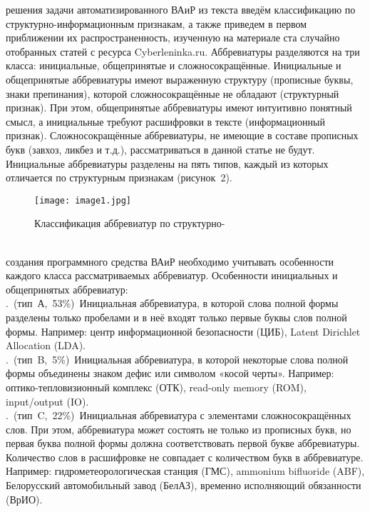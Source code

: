 \documentclass[a4paper, 12pt]{article}
\begin{document}
 решения задачи автоматизированного ВАиР из текста введём классификацию по структурно-информационным признакам, а также приведем в первом приближении их распространенность, изученную на материале ста случайно отобранных статей с ресурса Cyberleninka.ru. Аббревиатуры разделяются на три класса: инициальные, общепринятые и сложносокращённые. Инициальные и общепринятые аббревиатуры имеют выраженную структуру (прописные буквы, знаки препинания), которой сложносокращённые не обладают (структурный признак). При этом, общепринятые аббревиатуры имеют интуитивно понятный смысл, а инициальные требуют расшифровки в тексте (информационный признак). Сложносокращённые аббревиатуры, не имеющие в составе прописных букв (завхоз, ликбез и т.д.), рассматриваться в данной статье не будут. Инициальные аббревиатуры разделены на пять типов, каждый из которых отличается по структурным признакам (рисунок 2).
\begin{figure}[!h]
    \begin{center}
        \texttt{[image: image1.jpg]}
        \caption{Классификация аббревиатур по структурно-\\ }
        \label{claster_pic1}
    \end{center}
\end{figure}
\\
 создания программного средства ВАиР необходимо учитывать особенности каждого класса рассматриваемых аббревиатур. 
Особенности инициальных и общепринятых аббревиатур:\\
. (тип А, 53\%) Инициальная аббревиатура, в которой слова полной формы разделены только пробелами и в неё входят только первые буквы слов полной формы. Например: центр информационной безопасности (ЦИБ), Latent Dirichlet Allocation (LDA).\\
. (тип B, 5\%) Инициальная аббревиатура, в которой некоторые слова полной формы объединены знаком дефис или символом «косой черты». Например: оптико-тепловизионный комплекс (ОТК), read-only memory (ROM), input/output (IO).\\
. (тип C, 22\%) Инициальная аббревиатура с элементами сложносокращённых слов. При этом, аббревиатура может состоять не только из прописных букв, но первая буква полной формы должна соответствовать первой букве аббревиатуры. Количество слов в расшифровке не совпадает с количеством букв в аббревиатуре. Например: гидрометеорологическая станция (ГМС), ammonium bifluoride (ABF), Белорусский автомобильный завод (БелАЗ), временно исполняющий обязанности (ВрИО).\\
\end{document}
